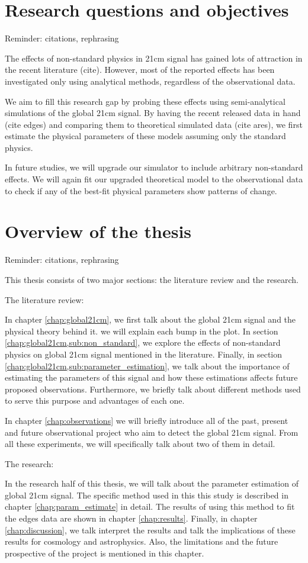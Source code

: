 \documentclass[12pt, TexShade, letterpaper]{report}
\begin{document}
\section{Research questions and objectives}
Reminder: citations, rephrasing \par
The effects of non-standard physics in 21cm signal has gained lots of attraction in the recent literature (cite). However, most of the reported effects has been investigated only using analytical methods, regardless of the observational data.\par
We aim to fill this research gap by probing these effects using semi-analytical simulations of the global 21cm signal. By having the recent released data in hand (cite edges) and comparing them to theoretical simulated data (cite ares), we first estimate the physical parameters of these models assuming only the standard physics. \par
In future studies, we will upgrade our simulator to include arbitrary non-standard effects. We will again fit our upgraded theoretical model to the observational data to check if any of the best-fit physical parameters show patterns of change.
\section{Overview of the thesis}
Reminder: citations, rephrasing\par
This thesis consists of two major sections: the literature review and the research.\par
The literature review:\par
In chapter \ref{chap:global21cm}, we first talk about the global 21cm signal and the physical theory behind it. we will explain each bump in the plot. In section \ref{chap:global21cm,sub:non_standard}, we explore the effects of non-standard physics on global 21cm signal mentioned in the literature. Finally, in section \ref{chap:global21cm,sub:parameter_estimation}, we talk about the importance of estimating the parameters of this signal and how these estimations affects future proposed observations. Furthermore, we briefly talk about different methods used to serve this purpose and advantages of each one.\par
In chapter \ref{chap:observations} we will briefly introduce all of the past, present and future observational project who aim to detect the global 21cm signal. From all these experiments, we will specifically talk about two of them in detail.\par
The research:\par
In the research half of this thesis, we will talk about the parameter estimation of global 21cm signal. The specific method used in this this study is described in chapter \ref{chap:param_estimate} in detail. The results of using this method to fit the edges data are shown in chapter \ref{chap:results}. Finally, in chapter \ref{chap:discussion}, we talk interpret the results and talk the implications of these results for cosmology and astrophysics. Also, the limitations and the future prospective of the project is mentioned in this chapter.\par
\end{document}

